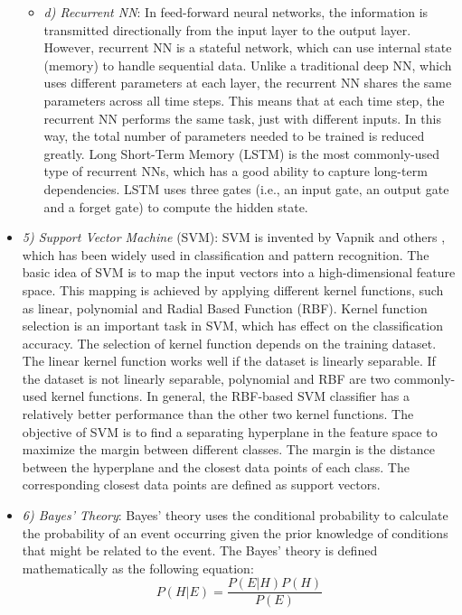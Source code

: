 \begin{itemize}
\begin{itemize}
\item[]\textit{d)	Recurrent NN}: In feed-forward neural networks, the information is transmitted directionally from the input layer to the output layer. However, recurrent NN is a stateful network, which can use internal state (memory) to handle sequential data. Unlike a traditional deep NN, which uses different parameters at each layer, the recurrent NN shares the same parameters across all time steps. This means that at each time step, the recurrent NN performs the same task, just with different inputs. In this way, the total number of parameters needed to be trained is reduced greatly. Long Short-Term Memory (LSTM) \cite{Li2015a} is the most commonly-used type of recurrent NNs, which has a good ability to capture long-term dependencies. LSTM uses three gates (i.e., an input gate, an output gate and a forget gate) to compute the hidden state.
\end{itemize}
\item[]\textit{5) Support Vector Machine} (SVM): SVM is invented by Vapnik and others \cite{Vapnik1999}, which has been widely used in classification and pattern recognition. The basic idea of SVM is to map the input vectors into a high-dimensional feature space. This mapping is achieved by applying different kernel functions, such as linear, polynomial and Radial Based Function (RBF). Kernel function selection is an important task in SVM, which has effect on the classification accuracy. The selection of kernel function depends on the training dataset. The linear kernel function works well if the dataset is linearly separable. If the dataset is not linearly separable, polynomial and RBF are two commonly-used kernel functions. In general, the RBF-based SVM classifier has a relatively better performance than the other two kernel functions.
The objective of SVM is to find a separating hyperplane in the feature space to maximize the margin between different classes. The margin is the distance between the hyperplane and the closest data points of each class. The corresponding closest data points are defined as support vectors.
\item[]\textit{6) Bayes’ Theory}: Bayes’ theory uses the conditional probability to calculate the probability of an event occurring given the prior knowledge of conditions that might be related to the event. The Bayes’ theory is defined mathematically as the following equation:
\begin{equation*}
P(H\vert E)=\dfrac{P(E\vert H)P(H)}{P(E)}
\end{equation*}

\end{itemize}
